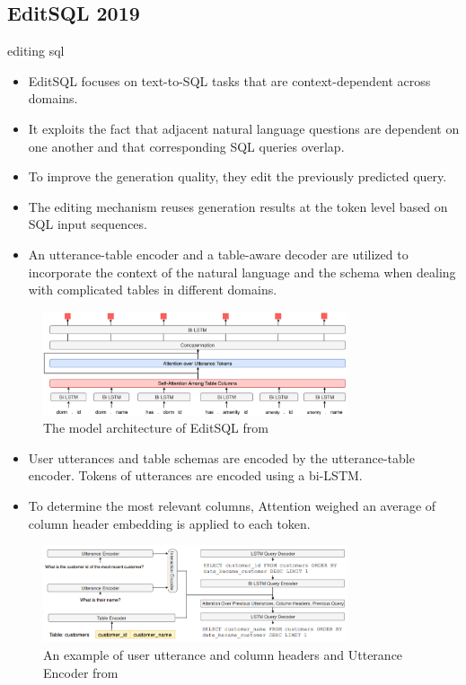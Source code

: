 \subsection{EditSQL 2019}
editing sql\cite{DBLP:journals/corr/abs-1909-00786}

\begin{itemize}
    \item EditSQL focuses on text-to-SQL tasks that are context-dependent across domains.
    \item It exploits the fact that adjacent natural language questions are dependent on one another and that corresponding SQL queries overlap.
    \item To improve the generation quality, they edit the previously predicted query.
    \item The editing mechanism reuses generation results at the token level based on SQL input sequences.
    \item An utterance-table encoder and a table-aware decoder are utilized to incorporate the context of the natural language and the schema when dealing with complicated tables in different domains.
\end{itemize}

\begin{figure}[htb]
    \centering
    \includegraphics[width=0.8\textwidth]{pics/EditSQL/Table.png}
    \caption{The model architecture of EditSQL from \cite{DBLP:journals/corr/abs-1909-00786}}
    \label{fig:EditSQL}
\end{figure}


\begin{itemize}
    \item User utterances and table schemas are encoded by the utterance-table encoder. Tokens of utterances are encoded using a bi-LSTM.
    \item To determine the most relevant columns, Attention weighed an average of column header embedding is applied to each token.
\end{itemize}

\begin{figure}[htb]
    \centering
    \includegraphics[width=0.8\textwidth]{pics/EditSQL/model.png}
    \caption{An example of user utterance and column headers and Utterance Encoder from \cite{DBLP:journals/corr/abs-1909-00786}}
    \label{fig:EditSQL_model}
\end{figure}

